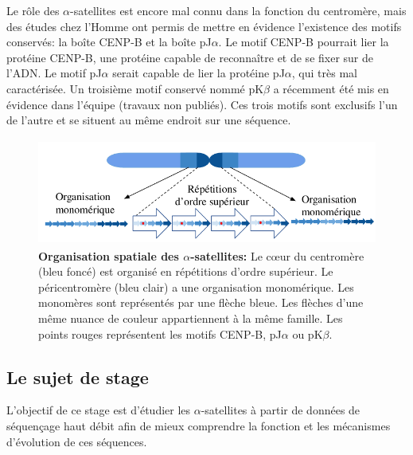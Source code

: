 \documentclass[12pt,a4paper]{article}
\begin{document}
Le rôle des $\alpha$-satellites est encore mal connu dans la fonction du centromère, mais des études chez l'Homme ont permis de mettre en évidence l'existence des motifs conservés: la boîte CENP-B et la boîte pJ$\alpha$. Le motif CENP-B pourrait lier la protéine CENP-B, une protéine capable de reconnaître et de se fixer sur de l'ADN. Le motif pJ$\alpha$ serait capable de lier la protéine pJ$\alpha$, qui très mal caractérisée. Un troisième motif conservé nommé pK$\beta$ a récemment été mis en évidence dans l'équipe (travaux non publiés). Ces trois motifs sont exclusifs l'un de l'autre et se situent au même endroit sur une séquence.

\begin{figure}[!h]
\center
	\includegraphics[height=3.5cm, width=12cm]{img/AS_organization.png}
	\caption{\textbf{Organisation spatiale des $\alpha$-satellites:} Le cœur du centromère (bleu foncé) est organisé en répétitions d'ordre supérieur. Le péricentromère (bleu clair) a une organisation monomérique. Les monomères sont représentés par une flèche bleue. Les flèches d'une même nuance de couleur appartiennent à la même famille. Les points rouges représentent les motifs CENP-B, pJ$\alpha$ ou pK$\beta$. \label{organisation_spatiale}}
\end{figure}

\subsection{Le sujet de stage}

L'objectif de ce stage est d'étudier les $\alpha$-satellites à partir de données de séquençage haut débit afin de mieux comprendre la fonction  et les mécanismes d'évolution de ces séquences. 
\end{document}
